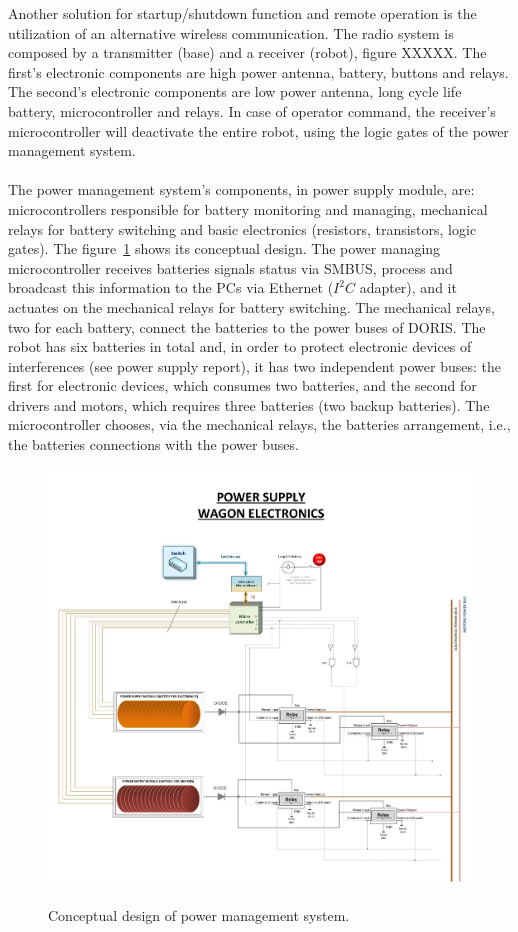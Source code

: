 Another solution for startup/shutdown function and remote operation is the utilization of an alternative wireless communication. The radio system is composed by a transmitter (base) and a receiver (robot), figure XXXXX. The first's electronic components are high power antenna, battery, buttons and relays. The second's electronic components are low power antenna, long cycle life battery, microcontroller and relays. In case of operator command, the receiver's microcontroller will deactivate the entire robot, using the logic gates of the power management system.\\
\\
The power management system's components, in power supply module, are: microcontrollers responsible for battery monitoring and managing, mechanical relays for battery switching and basic electronics (resistors, transistors, logic gates). The figure~\ref{FIG:SUPCIRPS1} shows its conceptual design. The power managing microcontroller receives batteries signals status via SMBUS, process and broadcast this information to the PCs via Ethernet ($I^2{C}$ adapter), and it actuates on the mechanical relays for battery switching. The mechanical relays, two for each battery, connect the batteries to the power buses of DORIS. The robot has six batteries in total and, in order to protect electronic devices of interferences (see power supply report), it has two independent power buses: the first for electronic devices, which consumes two batteries, and the second for drivers and motors, which requires three batteries (two backup batteries). The microcontroller chooses, via the mechanical relays, the batteries arrangement, i.e., the batteries connections with the power buses.
\begin{figure}
  \centering
  \includegraphics[width=1\columnwidth]{figs/tables/geralblockPS1.pdf}\\
  \caption[Conceptual design of power management system]{Conceptual design of power management system.}
  \label{FIG:SUPCIRPS1}
\end{figure}
